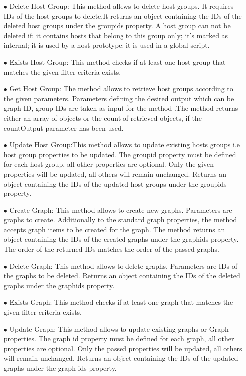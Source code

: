 \documentclass{article}
\begin{document}
\begin{itemize}
\item[$\bullet$]Delete Host Group: This method allows to delete host groups.  It requires  IDs of the host groups to delete.It returns an object containing the IDs of the deleted host groups under the groupids property. A host group can not be deleted if:
it contains hosts that belong to this group only;
it's marked as internal;
it is used by a host prototype;
it is used in a global script.

\item[$\bullet$]Exists Host Group: This method checks if at least one host group that matches the given filter criteria exists.

\item[$\bullet$]Get Host Group: The method allows to retrieve host groups according to the given parameters.  Parameters defining the desired output which can be graph ID, group IDs are taken as input for the method .The method returns either an array of objects or the count of retrieved objects, if the countOutput parameter has been used.

\item[$\bullet$]Update Host Group:This method allows to update existing hosts groups i.e host group properties to be updated. The groupid property must be defined for each host group, all other properties are optional. Only the given properties will be updated, all others will remain unchanged. Returns an object containing the IDs of the updated host groups under the groupids property.

\item[$\bullet$]Create Graph: This method allows to create new graphs. Parameters are graphs to create. Additionally to the standard graph properties, the method accepts graph items to be created for the graph. The method returns an object containing the IDs of the created graphs under the graphids property. The order of the returned IDs matches the order of the passed graphs.

\item[$\bullet$]Delete Graph: This method allows to delete graphs. Parameters are IDs of the graphs to be deleted.  Returns an object containing the IDs of the deleted graphs under the graphids property.

\item[$\bullet$]Exists Graph: This method checks if at least one graph that matches the given filter criteria exists.

\item[$\bullet$]Update Graph: This method allows to update existing graphs or Graph properties. The graph id property must be defined for each graph, all other properties are optional. Only the passed properties will be updated, all others will remain unchanged. Returns an object containing the IDs of the updated graphs under the graph ids property.


\end{itemize}
\end{document}
